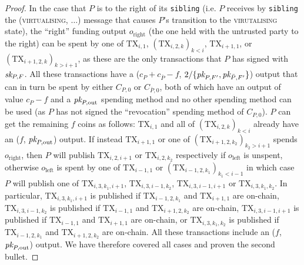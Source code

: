 \begin{proof}
  In the case that $P$ is to the right of its \texttt{sibling} (i.e. $P$
  receives by \texttt{sibling} the (\textsc{virtualising}, $\dots$) message that
  causes $P$'s transition to the \textsc{virutalising} state), the ``right''
  funding output $o_{\mathrm{right}}$ (the one held with the untrusted party to
  the right) can be spent by one of $\mathrm{TX}_{i, 1}$, $(\mathrm{TX}_{i, 2,
  k})_{k < i}$, $\mathrm{TX}_{i+1, 1}$, or $(\mathrm{TX}_{i+1, 2, k})_{k >
  i+1}$, as these are the only transactions that $P$ has signed with $\textit{sk}_{P,
  F}$. All these transactions have a ($c_P + c_{\bar{P}} - f$, $2/\{\textit{pk}_{P, F'},
  \textit{pk}_{\bar{P}, F'}\}$) output that can in turn be spent by either $C_{P, 0}$ or
  $C_{\bar{P}, 0}$, both of which have an output of value $c_P-f$ and a $\textit{pk}_{P,
  \mathrm{out}}$ spending method and no other spending method can be used (as
  $P$ has not signed the ``revocation'' spending method of $C_{P, 0}$). $P$ can
  get the remaining $f$ coins as follows: $\mathrm{TX}_{i, 1}$ and all of
  $(\mathrm{TX}_{i, 2, k})_{k < i}$ already have an ($f$, $\textit{pk}_{P,
  \mathrm{out}}$) output. If instead $\mathrm{TX}_{i+1, 1}$ or one of
  $(\mathrm{TX}_{i+1, 2, k_2})_{k_2 > i+1}$ spends $o_{\mathrm{right}}$, then
  $P$ will publish $\mathrm{TX}_{i, 2, i+1}$ or $\mathrm{TX}_{i, 2, k_2}$
  respectively if $o_{\mathrm{left}}$ is unspent, otherwise $o_{\mathrm{left}}$
  is spent by one of $\mathrm{TX}_{i-1, 1}$ or $(\mathrm{TX}_{i-1, 2, k_1})_{k_1
  < i-1}$ in which case $P$ will publish one of $\mathrm{TX}_{i, 3, k_1, i+1}$,
  $\mathrm{TX}_{i, 3, i-1, k_2}$, $\mathrm{TX}_{i, 3, i-1, i+1}$ or
  $\mathrm{TX}_{i, 3, k_1, k_2}$. In particular, $\mathrm{TX}_{i, 3, k_1, i+1}$
  is published if $\mathrm{TX}_{i-1, 2, k_1}$ and $\mathrm{TX}_{i+1, 1}$ are
  on-chain, $\mathrm{TX}_{i, 3, i-1, k_2}$ is published if $\mathrm{TX}_{i-1,
  1}$ and $\mathrm{TX}_{i+1, 2, k_2}$ are on-chain, $\mathrm{TX}_{i, 3, i-1,
  i+1}$ is published if $\mathrm{TX}_{i-1, 1}$ and $\mathrm{TX}_{i+1, 1}$ are
  on-chain, or $\mathrm{TX}_{i, 3, k_1, k_2}$ is published if $\mathrm{TX}_{i-1,
  2, k_1}$ and $\mathrm{TX}_{i+1, 2, k_2}$ are on-chain.  All these transactions
  include an ($f$, $\textit{pk}_{P, \mathrm{out}}$) output. We have therefore covered all
  cases and proven the second bullet.


\end{proof}
